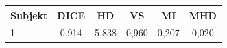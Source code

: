 \begin{tabular}{l c c c c c}
 \hline
Subjekt & DICE & HD & VS & MI & MHD \\ \hline
1 & 0,914 & 5,838 & 0,960 & 0,207 & 0,020 \\
\hline 
 \end{tabular}
